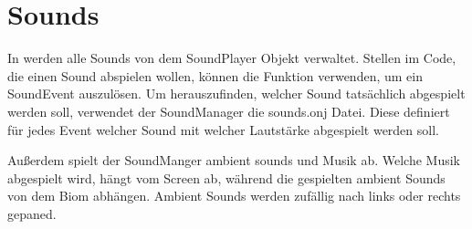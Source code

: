 
\section{Sounds}\label{sec:sounds}

\renewcommand{\kapitelautor}{Autor: Marvin Kurka}

In \FF werden alle Sounds von dem SoundPlayer Objekt verwaltet.
Stellen im Code, die einen Sound abspielen wollen, können die  Funktion verwenden,
um ein SoundEvent auszulösen.
Um herauszufinden, welcher Sound tatsächlich abgespielt werden soll, verwendet der SoundManager die sounds.onj Datei.
Diese definiert für jedes Event welcher Sound mit welcher Lautstärke abgespielt werden soll.

Außerdem spielt der SoundManger ambient sounds und Musik ab.
Welche Musik abgespielt wird, hängt vom Screen ab, während die gespielten ambient Sounds von dem Biom abhängen.
Ambient Sounds werden zufällig nach links oder rechts gepaned.

\vfill
\pagebreak

\renewcommand{\kapitelautor}{}
